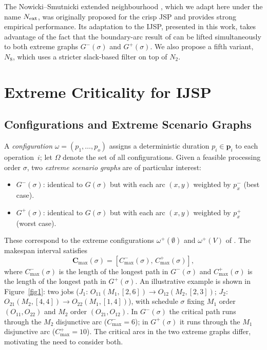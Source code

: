 \documentclass[preprint,12pt]{elsarticle}
\begin{document}
The Nowicki--Smutnicki extended neighbourhood \cite{Nowicki2005}, which we adapt here under the name $N_{\rm ext}$, was originally proposed for the crisp JSP and provides strong empirical performance. Its adaptation to the IJSP, presented in this work, takes advantage of the fact that the boundary-arc result of \cite{Nowicki1996} can be lifted simultaneously to both extreme graphs $G^-(\sigma)$ and $G^+(\sigma)$. We also propose a fifth variant, $N_8$, which uses a stricter slack-based filter on top of $N_2$.


\section{Extreme Criticality for IJSP}
\label{sec3}

\subsection{Configurations and Extreme Scenario Graphs}
\label{sec3.1}

A \emph{configuration} $\omega = (p_1,\ldots,p_o)$ assigns a deterministic duration $p_i \in \mathbf{p}_i$ to each operation~$i$; let $\Omega$ denote the set of all configurations. Given a feasible processing order $\sigma$, two \emph{extreme scenario graphs} are of particular interest:
\begin{itemize}
\item $G^-(\sigma)$: identical to $G(\sigma)$ but with each arc $(x,y)$ weighted by $p_{x}^{-}$ (best case).
\item $G^+(\sigma)$: identical to $G(\sigma)$ but with each arc $(x,y)$ weighted by $p_{x}^{+}$ (worst case).
\end{itemize}
These correspond to the extreme configurations $\omega^{+}(\emptyset)$ and $\omega^{+}(V)$ of \cite{Artigues2015}. The makespan interval satisfies
\begin{equation}
\mathbf{C}_{\max}(\sigma) = [C^-_{\max}(\sigma),\, C^+_{\max}(\sigma)],
\end{equation}
where $C^-_{\max}(\sigma)$ is the length of the longest path in $G^-(\sigma)$ and $C^+_{\max}(\sigma)$ is the length of the longest path in $G^+(\sigma)$. An illustrative example is shown in Figure~\ref{fig1}: two jobs ($J_1$: $O_{11}(M_1,[2,6])\!\to\!O_{12}(M_2,[2,3])$; $J_2$: $O_{21}(M_2,[4,4])\!\to\!O_{22}(M_1,[1,4])$), with schedule $\sigma$ fixing $M_1$ order $(O_{11},O_{22})$ and $M_2$ order $(O_{21},O_{12})$. In $G^-(\sigma)$ the critical path runs through the $M_2$ disjunctive arc ($C_{\max}^-=6$); in $G^+(\sigma)$ it runs through the $M_1$ disjunctive arc ($C_{\max}^+=10$). The critical arcs in the two extreme graphs differ, motivating the need to consider both.
\end{document}

